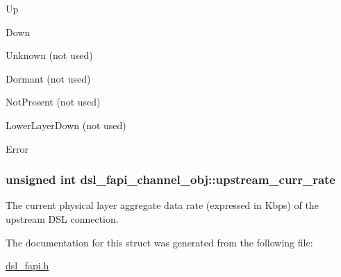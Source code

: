 \begin{DoxyItemize}
\item Up
\item Down
\item Unknown (not used)
\item Dormant (not used)
\item Not\-Present (not used)
\item Lower\-Layer\-Down (not used)
\item Error 
\end{DoxyItemize}\hypertarget{structdsl__fapi__channel__obj_a767b2e3a943d43f8f6114be408633486}{
\subsubsection[{upstream\-\_\-curr\-\_\-rate}]{\setlength{\rightskip}{0pt plus 5cm}unsigned int dsl\-\_\-fapi\-\_\-channel\-\_\-obj\-::upstream\-\_\-curr\-\_\-rate}}\label{structdsl__fapi__channel__obj_a767b2e3a943d43f8f6114be408633486}
The current physical layer aggregate data rate (expressed in Kbps) of the upstream D\-S\-L connection. 

The documentation for this struct was generated from the following file\-:\begin{DoxyCompactItemize}
\item 
\hyperlink{dsl__fapi_8h}{dsl\-\_\-fapi.\-h}\end{DoxyCompactItemize}
